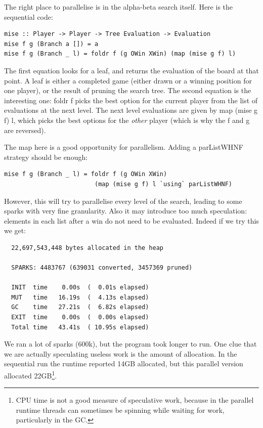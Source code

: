 \documentclass[twocolumn,9pt]{sigplanconf}
\newcommand{\codef}[1]{{\fontfamily{cmss}\small#1}}
\begin{document}
The right place to parallelise is in the alpha-beta search itself.
Here is the sequential code:

\begin{lstlisting}
mise :: Player -> Player -> Tree Evaluation -> Evaluation
mise f g (Branch a []) = a
mise f g (Branch _ l) = foldr f (g OWin XWin) (map (mise g f) l)
\end{lstlisting}

The first equation looks for a leaf, and returns the evaluation of the
board at that point.  A leaf is either a completed game (either drawn
or a winning position for one player), or the result of pruning the
search tree.  The second equation is the interesting one: \codef{foldr
  f} picks the best option for the current player from the list of
evaluations at the next level.  The next level evaluations are given
by \codef{map (mise g f) l}, which picks the best options for the
\emph{other} player (which is why the \codef{f} and \codef{g} are
reversed).

The \codef{map} here is a good opportunity for parallelism.  Adding
a \codef{parListWHNF} strategy should be enough:

\begin{lstlisting}
mise f g (Branch _ l) = foldr f (g OWin XWin) 
                         (map (mise g f) l `using` parListWHNF)
\end{lstlisting}
However, this will try to parallelise every level of the search,
leading to some sparks with very fine granularity.  Also it may
introduce too much speculation: elements in each list after a win do
not need to be evaluated.  Indeed if we try this we get:

\begin{verbatim}
  22,697,543,448 bytes allocated in the heap

  SPARKS: 4483767 (639031 converted, 3457369 pruned)

  INIT  time    0.00s  (  0.01s elapsed)
  MUT   time   16.19s  (  4.13s elapsed)
  GC    time   27.21s  (  6.82s elapsed)
  EXIT  time    0.00s  (  0.00s elapsed)
  Total time   43.41s  ( 10.95s elapsed)
\end{verbatim}

We ran a lot of sparks (600k), but the program took longer to run.
One clue that we are actually speculating useless work is the amount
of allocation.  In the sequential run the runtime reported 14GB
allocated, but this parallel version allocated 22GB\footnote{CPU time
  is not a good measure of speculative work, because in the parallel
  runtime threads can sometimes be spinning while waiting for work,
  particularly in the GC.}.
\end{document}
